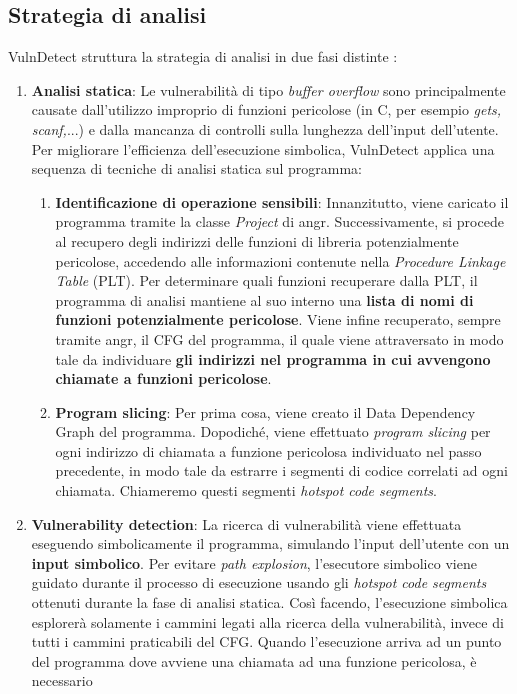 \documentclass[../main.tex]{subfiles}
\begin{document}
\subsection{Strategia di analisi}
VulnDetect struttura la strategia di analisi in due fasi distinte \cite{VulnDetect}:
\begin{enumerate}
    \item \textbf{Analisi statica}: Le vulnerabilità di tipo \textit{buffer overflow} sono principalmente causate dall'utilizzo improprio di funzioni pericolose (in C, per esempio \textit{gets, scanf,}...) e dalla mancanza di controlli
    sulla lunghezza dell'input dell'utente. Per migliorare l'efficienza dell'esecuzione simbolica, VulnDetect applica una sequenza di tecniche di analisi statica sul programma:
    \begin{enumerate}
        \item \textbf{Identificazione di operazione sensibili}: Innanzitutto, viene caricato il programma tramite la classe \textit{Project} di angr.
        Successivamente, si procede al recupero degli indirizzi delle funzioni di libreria potenzialmente pericolose, accedendo alle informazioni contenute nella \textit{Procedure Linkage Table} (PLT).
        Per determinare quali funzioni recuperare dalla PLT, il programma di analisi mantiene al suo interno una \textbf{lista di nomi di funzioni potenzialmente pericolose}.
        Viene infine recuperato, sempre tramite angr, il CFG del programma, il quale viene attraversato in modo tale da individuare \textbf{gli indirizzi nel programma in cui avvengono chiamate a funzioni pericolose}.
        \item \textbf{Program slicing}: Per prima cosa, viene creato il Data Dependency Graph del programma. Dopodiché, viene effettuato \textit{program slicing} per ogni indirizzo di chiamata a funzione pericolosa individuato nel passo precedente, in modo tale
        da estrarre i segmenti di codice correlati ad ogni chiamata. Chiameremo questi segmenti \textit{hotspot code segments}.
    \end{enumerate}
    \item \textbf{Vulnerability detection}: La ricerca di vulnerabilità viene effettuata eseguendo simbolicamente il programma, simulando l'input dell'utente con un \textbf{input simbolico}. Per evitare \textit{path explosion}, l'esecutore simbolico viene guidato durante il processo di esecuzione usando gli \textit{hotspot code segments} ottenuti
    durante la fase di analisi statica. Così facendo, l'esecuzione simbolica esplorerà solamente i cammini legati alla ricerca della vulnerabilità, invece di tutti i cammini praticabili del CFG. Quando l'esecuzione arriva ad un punto del programma dove avviene una chiamata ad una funzione pericolosa, è necessario 

\end{enumerate}
\end{document}
